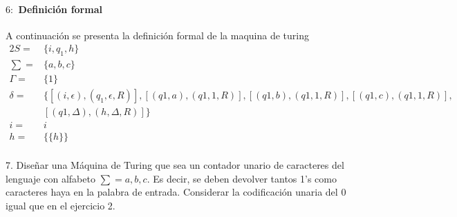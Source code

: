 \documentclass[10pt,a4paper]{book}
\begin{document}
{\begin{figure*}[ht!]
\end{figure*}
\paragraph{$6:$ Definición formal}A continuación se presenta la definición formal de la maquina de turing\\[0.2cm]
\begin{alignat*}{2}
	S=& \{i, q_1,h\}\\
	\textstyle \sum=& \{a,b,c\}\\
	\Gamma=&\{1\}\\
	\delta=&\{[(i,\epsilon), (q_1,\epsilon,R)], [(q1,a), (q1,1,R)], [(q1,b), (q1,1,R)], [(q1,c), (q1,1,R)],\\& [(q1,\Delta), (h,\Delta,R)]\}\\
	i=&i\\
	h=&\{\{h\}\}
\end{alignat*}
\newpage
\paragraph{}7. Diseñar una Máquina de Turing que sea un contador unario de caracteres del lenguaje con alfabeto $\sum = {a,b,c}$. Es decir, se deben devolver tantos 1’s como caracteres haya en la palabra de entrada. Considerar la codificación unaria del 0 igual que en el ejercicio 2.\\[1cm]
\begin{figure*}[ht!]
	\centering
\end{figure*}

}
\end{document}
